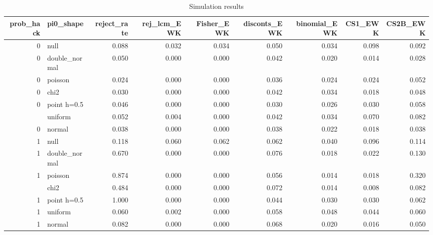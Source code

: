 \begin{table}

\caption{Simulation results}
\centering
\begin{tabular}[t]{rlrrrrrrr}
\toprule
prob_hack & pi0_shape & reject_rate & rej_lcm_EWK & Fisher_EWK & disconts_EWK & binomial_EWK & CS1_EWK & CS2B_EWK\\
\midrule
0 & null & 0.088 & 0.032 & 0.034 & 0.050 & 0.034 & 0.098 & 0.092\\
0 & double_normal & 0.050 & 0.000 & 0.000 & 0.042 & 0.020 & 0.014 & 0.028\\
0 & poisson & 0.024 & 0.000 & 0.000 & 0.036 & 0.024 & 0.024 & 0.052\\
0 & chi2 & 0.030 & 0.000 & 0.000 & 0.042 & 0.034 & 0.018 & 0.048\\
0 & point h=0.5 & 0.046 & 0.000 & 0.000 & 0.030 & 0.026 & 0.030 & 0.058\\
\addlinespace
0 & uniform & 0.052 & 0.004 & 0.000 & 0.042 & 0.034 & 0.070 & 0.082\\
0 & normal & 0.038 & 0.000 & 0.000 & 0.038 & 0.022 & 0.018 & 0.038\\
1 & null & 0.118 & 0.060 & 0.062 & 0.062 & 0.040 & 0.096 & 0.114\\
1 & double_normal & 0.670 & 0.000 & 0.000 & 0.076 & 0.018 & 0.022 & 0.130\\
1 & poisson & 0.874 & 0.000 & 0.000 & 0.056 & 0.014 & 0.018 & 0.320\\
\addlinespace
1 & chi2 & 0.484 & 0.000 & 0.000 & 0.072 & 0.014 & 0.008 & 0.082\\
1 & point h=0.5 & 1.000 & 0.000 & 0.000 & 0.044 & 0.030 & 0.030 & 0.062\\
1 & uniform & 0.060 & 0.002 & 0.000 & 0.058 & 0.048 & 0.044 & 0.060\\
1 & normal & 0.082 & 0.000 & 0.000 & 0.068 & 0.020 & 0.016 & 0.050\\
\bottomrule
\end{tabular}
\end{table}
